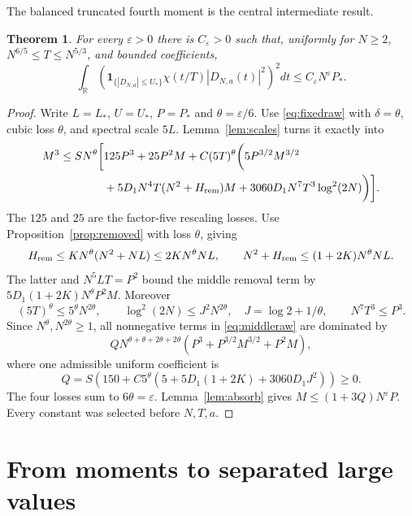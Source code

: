 \documentclass[11pt,a4paper,oneside]{article}
\newtheorem{theorem}{Theorem}[section]
\theoremstyle{definition}
\newcommand{\R}{\mathbb R}
\newcommand{\eps}{\varepsilon}
\newcommand{\one}{\mathbf 1}
\numberwithin{equation}{section}
\begin{document}
The balanced truncated fourth moment is the central intermediate result.
\begin{theorem}\label{thm:fourth}
For every $\eps>0$ there is $C_\eps>0$ such that, uniformly for
$N\ge2$, $N^{6/5}\le T\le N^{5/3}$, and bounded coefficients,
\[
 \int_\R\left(\one_{\{|D_{N,a}|\le U_*\}}
                  \chi(t/T)|D_{N,a}(t)|^2\right)^2dt
 \le C_\eps N^\eps P_*.
\]
\end{theorem}
\begin{proof}
Write $L=L_*$, $U=U_*$, $P=P_*$ and $\theta=\eps/6$.
Use \eqref{eq:fixedraw} with $\delta=\theta$, cubic loss $\theta$,
and spectral scale $5L$. Lemma~\ref{lem:scales} turns it exactly into
\begin{equation}\label{eq:middleraw}
\begin{aligned}
 M^3\le SN^\theta\bigg[&125P^3+25P^2M+C(5T)^\theta\bigg(
        5P^{3/2}M^{3/2}\\
 &+5D_1N^4T(N^2+H_{\rm rem})M
               +3060D_1N^7T^3\log^2(2N)\bigg)\bigg].
\end{aligned}
\end{equation}
The $125$ and $25$ are the factor-five rescaling losses.
Use Proposition~\ref{prop:removed} with loss $\theta$, giving
\[
 H_{\rm rem}\le KN^\theta(N^2+NL)\le2KN^\theta NL,
 \qquad N^2+H_{\rm rem}\le(1+2K)N^\theta NL.
\]
The latter and $N^5LT=P^2$ bound the middle removal term by
$5D_1(1+2K)N^\theta P^2M$.
Moreover
\[
 (5T)^\theta\le5^\theta N^{2\theta},\qquad
 \log^2(2N)\le J^2N^{2\theta},\quad J=\log2+1/\theta,
 \qquad N^7T^3\le P^3.
\]
Since $N^\theta,N^{2\theta}\ge1$, all nonnegative terms in
\eqref{eq:middleraw} are dominated by
\[
 QN^{\theta+\theta+2\theta+2\theta}
       (P^3+P^{3/2}M^{3/2}+P^2M),
\]
where one admissible uniform coefficient is
\[
 Q=S\left(150+C5^\theta
       \left(5+5D_1(1+2K)+3060D_1J^2\right)\right)\ge0.
\]
The four losses sum to $6\theta=\eps$. Lemma~\ref{lem:absorb} gives
$M\le(1+3Q)N^\eps P$. Every constant was selected before $N,T,a$.
\end{proof}
\section{From moments to separated large values}\label{ch:middle}
\end{document}
